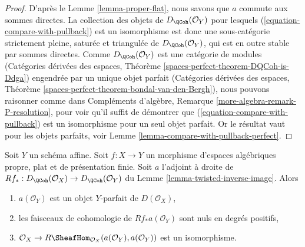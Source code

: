 \begin{proof}
D'après le Lemme \ref{lemma-proper-flat}, nous savons que $a$ commute
aux sommes directes. La collection des objets de
$D_\QCoh(\mathcal{O}_Y)$ pour lesquels (\ref{equation-compare-with-pullback})
est un isomorphisme est donc une sous-catégorie strictement pleine, saturée et triangulée
de $D_\QCoh(\mathcal{O}_Y)$, qui est en outre
stable par sommes directes. Comme $D_\QCoh(\mathcal{O}_Y)$
est une catégorie de modules (Catégories dérivées des espaces, Théorème
\ref{spaces-perfect-theorem-DQCoh-is-Ddga}) engendrée par un unique
objet parfait (Catégories dérivées des espaces, Théorème
\ref{spaces-perfect-theorem-bondal-van-den-Bergh}),
nous pouvons raisonner comme dans
Compléments d'algèbre, Remarque \ref{more-algebra-remark-P-resolution},
pour voir qu'il suffit de démontrer que (\ref{equation-compare-with-pullback})
est un isomorphisme pour un seul objet parfait.
Or le résultat vaut pour les objets parfaits, voir
Lemme \ref{lemma-compare-with-pullback-perfect}.
\end{proof}

\begin{lemma}
\label{lemma-properties-relative-dualizing}
Soit $Y$ un schéma affine. Soit $f : X \to Y$ un morphisme
d'espaces algébriques propre, plat et de présentation finie.
Soit $a$ l'adjoint à droite de
$Rf_* : D_\QCoh(\mathcal{O}_X) \to D_\QCoh(\mathcal{O}_Y)$ du
Lemme \ref{lemma-twisted-inverse-image}.
Alors
\begin{enumerate}
\item $a(\mathcal{O}_Y)$ est un objet $Y$-parfait de $D(\mathcal{O}_X)$,
\item les faisceaux de cohomologie de $Rf_*a(\mathcal{O}_Y)$
sont nuls en degrés positifs,
\item $\mathcal{O}_X \to
R\SheafHom_{\mathcal{O}_X}(a(\mathcal{O}_Y), a(\mathcal{O}_Y))$
est un isomorphisme.
\end{enumerate}
\end{lemma}

